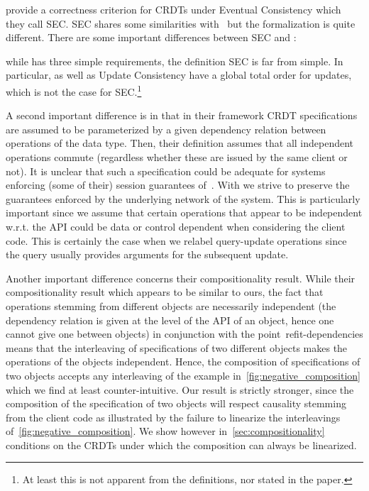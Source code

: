 
\citet{JagadeesanR18} provide a correctness criterion for CRDTs under
Eventual Consistency which they call SEC.
%
SEC shares some similarities with~\cite{PerrinMJ14} but the
formalization is quite different.
There are some important differences between SEC and \CRDTLinshort{}:
\begin{inparaenum}
\item while \CRDTLinshort{} has three simple requirements, the
  definition SEC is far from simple.
  In particular, \CRDTLinshort{} as well as Update Consistency have a
  global total order for updates, which is not the case for
  SEC.\footnote{At least this is not apparent from the definitions, nor
    stated in the paper.}
\item
  \label{it-dependencies}
  A second important difference is in that in their framework CRDT
  specifications are assumed to be parameterized by a given dependency
  relation between operations of the data type.
  Then, their definition assumes that all independent operations
  commute (regardless whether these are issued by the same client or
  not).
  It is unclear that such a specification could be adequate for
  systems enforcing (some of their) session guarantees
  of~\cite{TerryDPSTW94}.
  With \CRDTLinshort{} we strive to preserve the guarantees enforced by the
  underlying network of the system.
  This is particularly important since we assume that certain
  operations that appear to be independent w.r.t. the API could be
  data or control dependent when considering the client code.
  This is certainly the case when we relabel query-update operations
  since the query usually provides arguments for the subsequent
  update.
\item Another important difference concerns their compositionality
  result.
  While their compositionality result which appears to be similar to
  ours, the fact that operations stemming from different objects are
  necessarily independent (the dependency relation is given at the level
  of the API of an object, hence one cannot give one between objects) in
  conjunction with the point~ref{it-dependencies} means that the
  interleaving of specifications of two different objects makes the
  operations of the objects independent.
  Hence, the composition of specifications of two objects accepts any
  interleaving of the example in~\autoref{fig:negative_composition}
  which we find at least counter-intuitive.
  Our result is strictly stronger, since the composition of the
  specification of two objects will respect causality stemming from
  the client code as illustrated by the failure to linearize the
  interleavings of~\autoref{fig:negative_composition}.
  We show however in~\autoref{sec:compositionality} conditions on the
  CRDTs under which the composition can always be linearized.
\end{inparaenum}

